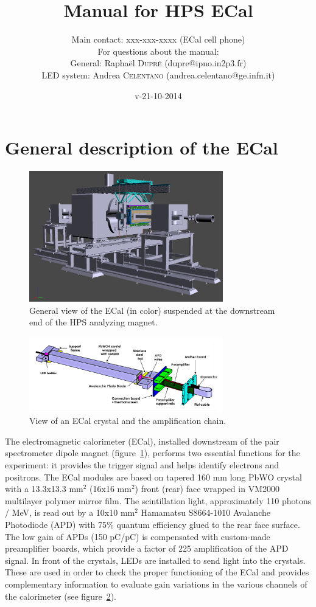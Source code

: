 \documentclass[12pt]{article}
\title{Manual for HPS ECal}
\author{Main contact: xxx-xxx-xxxx (ECal cell phone) \\ 
For questions about the manual: \\
General: Rapha\"el \textsc{Dupr\'e} (dupre@ipno.in2p3.fr)\\ 
LED system: Andrea \textsc{Celentano} (andrea.celentano@ge.infn.it)
}
\date{v-21-10-2014}
\begin{document}
\maketitle{}

   \section{General description of the ECal}

\begin{figure}
\center
\includegraphics[width=0.75\textwidth]{GView.png}
\caption{\small \label{GView} General view of the ECal (in color) suspended at the downstream end of the HPS analyzing magnet.}
\end{figure}

\begin{figure}
\center
\includegraphics[width=0.75\textwidth]{CrystalAssembly.png}
\caption{\small \label{AmplChain} View of an ECal crystal and the amplification chain.}
\end{figure}
      

The electromagnetic calorimeter (ECal), installed downstream of the pair spectrometer dipole magnet (figure~\ref{GView}), performs two essential functions for the experiment: it provides the trigger signal and helps identify electrons and positrons. The ECal modules are based on tapered 160 mm long PbWO crystal with a 13.3x13.3 mm$^2$ (16x16 mm$^2$) front (rear) face wrapped in VM2000 multilayer polymer mirror film. The scintillation light, approximately 110 photons / MeV, is read out by a 10x10 mm$^2$ Hamamatsu S8664-1010 Avalanche Photodiode (APD) with 75\% quantum efficiency glued to the rear face surface. The low gain of APDs (150 pC/pC) is compensated with custom-made preamplifier boards, which provide a factor of 225 amplification of the APD signal. In front of the crystals, LEDs are installed to send light into the crystals. These are used in order to check the proper functioning of the ECal and provides complementary information to evaluate gain variations in the various channels of the calorimeter (see figure~\ref{AmplChain}).
\end{document}
